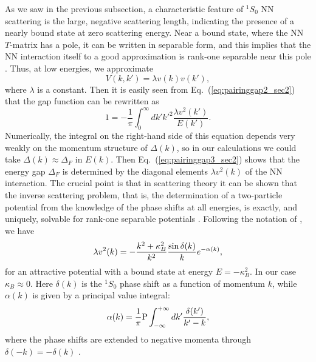 \documentclass[rmp,aps,floatfix]{revtex4}
\begin{document}
As we saw in the previous subsection, 
a characteristic feature of $^1S_0$ NN scattering is the large, negative 
scattering length, indicating the presence
of a nearly bound state at zero scattering energy.  Near a bound state, 
where the NN $T$-matrix has a pole, it can be written in separable form, 
and this implies that the NN interaction itself to a good approximation is 
rank-one separable near this pole \cite{kkc96,kohler96}.   
Thus, at low energies, we approximate
\begin{equation}
       V(k,k')=\lambda v(k)v(k'),
       \label{eq:separableV1_sec2} 
\end{equation}
where $\lambda$ is a constant.  Then it is easily seen from 
Eq.~(\ref{eq:pairinggap2_sec2}) 
that the gap function can be rewritten as 
\begin{equation}
      1=-\frac{1}{\pi}
      \int_{0}^{\infty}dk'k'^2\frac{\lambda v^2(k')}{E(k')}.
      \label{eq:pairinggap3_sec2}
\end{equation}
Numerically, the integral on the right-hand side of this equation depends 
very weakly on the momentum structure of $\Delta(k)$, so in our 
calculations we could take $\Delta(k)\approx \Delta_F$ in $E(k)$.  
Then Eq.~(\ref{eq:pairinggap3_sec2})  
shows that the energy gap $\Delta_F$ is 
determined by the diagonal elements $\lambda v^2(k)$ of the NN interaction.  
The crucial point is that in scattering theory it can be shown that 
the inverse scattering problem, that is, the determination of a 
two-particle potential from the knowledge of the phase shifts at all 
energies, is exactly, and uniquely, solvable for rank-one 
separable potentials \cite{cs92}.  Following the notation 
of \cite{bj76}, we have 
\begin{equation}
       \lambda v^2(k)=-{{k^2+\kappa_B^2}\over{k^2}}
                       {{\sin \delta(k)}\over{k}}e^{-\alpha(k)},
       \label{eq:separableV2_sec2} 
\end{equation}
for an attractive potential with a bound state at energy $E=-\kappa_B^2$. 
In our case $\kappa_B\approx 0$.    
Here $\delta(k)$ is the $^1S_0$ phase shift as a function of momentum $k$, 
while $\alpha(k)$ is given by a principal value integral: 
\begin{equation}
       \alpha(k)={{1}\over{\pi}}{\rm P}\int_{-\infty}^{+\infty}dk'
                 {{\delta(k')}\over{k'-k}},   
       \label{eq:phaseshift1_sec2} 
\end{equation}
where the phase shifts are extended to negative momenta through 
$\delta(-k)=-\delta(k)$ \cite{kohler96}.
\end{document}

